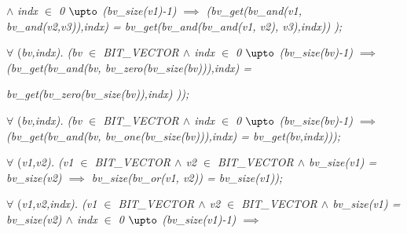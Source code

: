 \hspace*{1.40in} $\land$  \it indx $\in$  \rm 0 $\upto$ \rm (\it bv\_size\rm (\it v1\rm )\rm -\rm 1\rm ) $\implies$  \rm (\it bv\_get\rm (\it bv\_and\rm (\it v1\rm , \it bv\_and\rm (\it v2\rm ,\it v3\rm )\rm )\rm ,\it indx\rm ) \rm = \it bv\_get\rm (\it bv\_and\rm (\it bv\_and\rm (\it v1\rm , \it v2\rm )\rm , \it v3\rm )\rm ,\it indx\rm )\rm ) \rm )\rm ;

\hspace*{0.35in}

\hspace*{0.20in} $\forall$  \rm (\it bv\rm ,\it indx\rm )\rm . \rm (\it bv  $\in$  \it BIT\_VECTOR  $\land$  \it indx $\in$ \rm 0 $\upto$ \rm (\it bv\_size\rm (\it bv\rm )\rm -\rm 1\rm )  $\implies$  \rm (\it bv\_get\rm (\it bv\_and\rm (\it bv\rm , \it bv\_zero\rm (\it bv\_size\rm (\it bv\rm )\rm )\rm )\rm ,\it indx\rm ) \rm = 

\hspace*{1.00in}\it bv\_get\rm (\it bv\_zero\rm (\it bv\_size\rm (\it bv\rm )\rm )\rm ,\it indx\rm ) \rm )\rm )\rm ;

\vspace*{4mm}
\hspace*{0.20in} $\forall$  \rm (\it bv\rm ,\it indx\rm )\rm . \rm (\it bv  $\in$  \it BIT\_VECTOR  $\land$  \it indx $\in$ \rm 0 $\upto$ \rm (\it bv\_size\rm (\it bv\rm )\rm -\rm 1\rm )  $\implies$  \rm (\it bv\_get\rm (\it bv\_and\rm (\it bv\rm , \it bv\_one\rm (\it bv\_size\rm (\it bv\rm )\rm )\rm )\rm ,\it indx\rm ) \rm = \it bv\_get\rm (\it bv\rm ,\it indx\rm )\rm )\rm )\rm ;

\vspace*{4mm}
\hspace*{0.20in} $\forall$  \rm (\it v1\rm ,\it v2\rm )\rm . \rm (\it v1  $\in$  \it BIT\_VECTOR  $\land$  \it v2  $\in$  \it BIT\_VECTOR  $\land$  \it bv\_size\rm (\it v1\rm ) \rm = \it bv\_size\rm (\it v2\rm )  $\implies$  \it bv\_size\rm (\it bv\_or\rm (\it v1\rm , \it v2\rm )\rm ) \rm = \it bv\_size\rm (\it v1\rm )\rm )\rm ;

\hspace*{0.35in}

\hspace*{0.20in} $\forall$  \rm (\it v1\rm ,\it v2\rm ,\it indx\rm )\rm . \rm (\it v1  $\in$  \it BIT\_VECTOR  $\land$  \it v2  $\in$  \it BIT\_VECTOR  $\land$  \it bv\_size\rm (\it v1\rm ) \rm = \it bv\_size\rm (\it v2\rm )  $\land$  \it indx $\in$ \rm 0 $\upto$ \rm (\it bv\_size\rm (\it v1\rm )\rm -\rm 1\rm )  $\implies$ 

